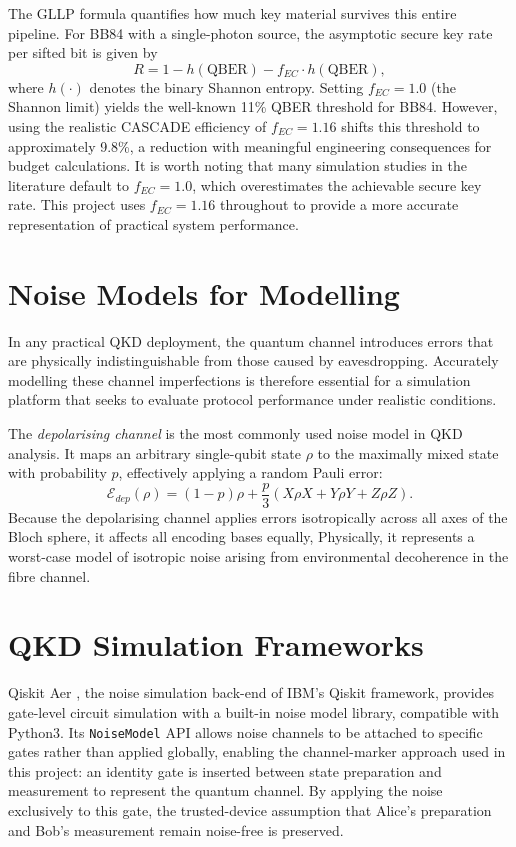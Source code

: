 The GLLP formula \cite{GLLP2004} quantifies how much key material survives this entire pipeline. For BB84 with a single-photon source, the asymptotic secure key rate per sifted bit is given by
%
\begin{equation}
\label{eq:gllp}
R = 1 - h(\text{QBER}) - f_{EC} \cdot h(\text{QBER}),
\end{equation}
%
where $h(\cdot)$ denotes the binary Shannon entropy. Setting $f_{EC} = 1.0$ (the Shannon limit) yields the well-known 11\% QBER threshold for BB84. However, using the realistic CASCADE efficiency of $f_{EC} = 1.16$ shifts this threshold to approximately 9.8\%, a reduction with meaningful engineering consequences for budget calculations. It is worth noting that many simulation studies in the literature default to $f_{EC} = 1.0$, which overestimates the achievable secure key rate. This project uses $f_{EC} = 1.16$ throughout to provide a more accurate representation of practical system performance.

\section{Noise Models for Modelling} 

In any practical QKD deployment, the quantum channel introduces errors that are physically indistinguishable from those caused by eavesdropping. Accurately modelling these channel imperfections is therefore essential for a simulation platform that seeks to evaluate protocol performance under realistic conditions.

The \textit{depolarising channel} is the most commonly used noise model in QKD analysis. It maps an arbitrary single-qubit state $\rho$ to the maximally mixed state with probability $p$, effectively applying a random Pauli error:
%
\begin{equation}
\label{eq:depolarising}
\mathcal{E}_{dep}(\rho) = (1-p)\rho + \frac{p}{3}(X\rho X + Y\rho Y + Z\rho Z).
\end{equation}
%
Because the depolarising channel applies errors isotropically across all axes of the Bloch sphere, it affects all encoding bases equally, Physically, it represents a worst-case model of isotropic noise arising from environmental decoherence in the fibre channel.

\section{QKD Simulation Frameworks}
Qiskit Aer \cite{QiskitAer}, the noise simulation back-end of IBM's Qiskit framework, provides gate-level circuit simulation with a built-in noise model library, compatible with Python3. Its \texttt{NoiseModel} API allows noise channels to be attached to specific gates rather than applied globally, enabling the channel-marker approach used in this project: an identity gate is inserted between state preparation and measurement to represent the quantum channel. By applying the noise exclusively to this gate, the trusted-device assumption that Alice's preparation and Bob's measurement remain noise-free is preserved. 

